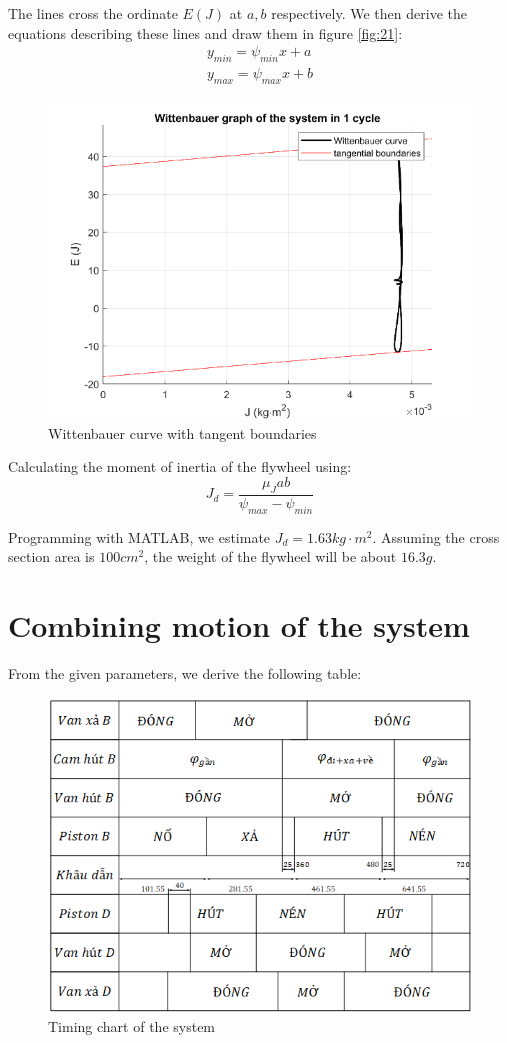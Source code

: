 The lines cross the ordinate $ E(J) $ at $ a, b $ respectively. We then derive the equations describing these lines and draw them in figure \ref{fig:21}:
\begin{equation}
	\begin{array}{c}
	y_{min}=\psi_{min} x + a\\
	y_{max}=\psi_{max} x + b
	\end{array}
\end{equation}
\begin{figure}
	\centering
	\includegraphics[width=0.6\linewidth]{22}
	\caption{Wittenbauer curve with tangent boundaries}
	\label{fig:22}
\end{figure}

Calculating the moment of inertia of the flywheel using:
\begin{equation}
	J_d=\dfrac{\mu_J ab}{\psi_{max}-\psi_{min}}
\end{equation}

Programming with MATLAB\textup{\textregistered}, we estimate $ J_d=1.63\unit{kg\cdot m^2} $. Assuming the cross section area is $ 100\unit{cm^2} $, the weight of the flywheel will be about $ 16.3\unit{g} $.
\section{Combining motion of the system}
From the given parameters, we derive the following table:
\begin{figure}[h]
	\centering
	\includegraphics[width=0.6\linewidth]{23}
	\caption{Timing chart of the system}
	\label{fig:23}
\end{figure}
